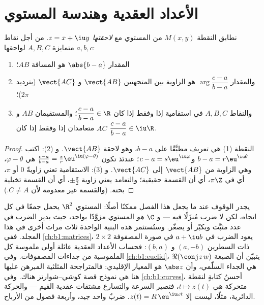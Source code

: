 \section{الأعداد العقدية وهندسة المستوي}

\begin{proposition}\label{prop:b1:complex:geometry}
نطابق النقطة $M(x, y)$ من المستوي مع \emph{لاحقتها} $z = x
+ \iu y$. من أجل نقاط متمايزة $A, B, C$ لواحقها $a, b,
c$:
\begin{enumerate}
  \item المقدار $\abs{b - a}$ هو المسافة $AB$؛
  \item والمقدار $\arg\dfrac{c - a}{b - a}$ هو الزاوية بين المتجهتين
        $\vect{AB}$ و $\vect{AC}$ (بترديد $2\pi$)؛
  \item والنقاط $A, B, C$ في استقامية إذا وفقط إذا كان $\dfrac{c - a}{b - a} \in
        \R$؛ والمستقيمان $AB$ و $AC$ متعامدان إذا وفقط إذا كان
        $\dfrac{c - a}{b - a} \in \iu\R$.
\end{enumerate}
\end{proposition}

\begin{proof}
النقطة (1) هي تعريف  مطبَّقًا على $b - a$، وهو لاحقة
$\vect{AB}$. و (2): اكتب $b - a = r\eu^{\iu\theta}$ و$c - a =
s\eu^{\iu\varphi}$؛ عندئذ تكون  $\frac{c-a}{b-a} = \frac sr
\eu^{\iu(\varphi - \theta)}$ هي $\varphi - \theta$، وهي
الزاوية من $\vect{AB}$ إلى $\vect{AC}$. و (3): الاستقامية تعني
زاويةً $0$ أو $\pi$، أي  في $\pi\Z$، أي أن القسمة حقيقية؛
والتعامد يعني زاوية $\pm\frac\pi2$، أي أن القسمة تخيلية بحتة.
(والقسمة غير معدومة لأن $C \neq A$.)
\end{proof}

\begin{remark}\label{rem:b1:complex:interlude}
يجدر الوقوف عند ما يجعل هذا الفصل ممكنًا أصلًا:
المستوي $\R^2$ يحمل جمعًا في كل اتجاه، لكن لا ضرب
مُنزَلًا فيه --- و $\C$ \emph{هو} المستوي
مزوَّدًا بواحد، حيث يدير الضرب في عدد مثبَّت ويكبّر أو يصغّر.
وستُستثمر هذه البنية الواحدة ثلاث مرات أخرى في هذا المجلد. ففي
\cref{ch:b1:matrices}، يعود الضرب في
$a + \iu b$ في صورة المصفوفة $2 \times 2$ ذات السطرين $(a,
-b)$ و $(b, a)$: فحساب الأعداد العقدية عائلة أولى ملموسة كل
الملموسية من جداءات المصفوفات. وفي \cref{ch:b1:euclid}، يتبيّن
أن الصيغة $\Re(\conj z\,w)$ هي الجداء السلّمي، وأن
$\abs z$ هو المعيار الإقليدي: فالمتراجحة المثلثية المبرهن عليها هنا
هي نموذج قصة كوشي--شوارتز هناك. وفي
\cref{ch:b1:curves}، أحسنُ كتابةٍ لنقطة متحركة هي $t \mapsto
z(t)$، فتصير السرعة والتسارع مشتقات عقدية القيم
--- والحركة الدائرية، مثلًا، ليست إلا $z(t) =
R\,\eu^{\iu\omega t}$. ضربٌ واحد جيد، وأربعة فصول من
الأرباح.
\end{remark}

